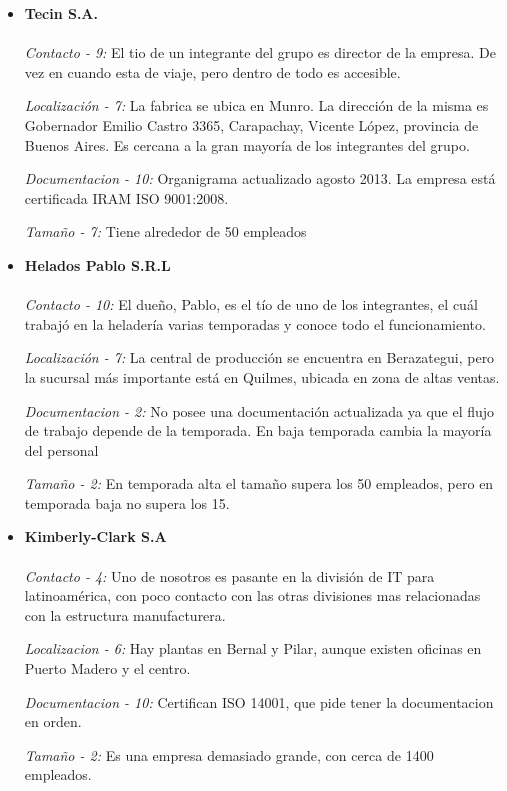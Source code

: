 \documentclass[a4paper,10pt]{article}
\begin{document}
\begin{itemize}

\item \textbf{Tecin S.A.}\\
\\
\textit{Contacto - 9:}
El tio de un integrante del grupo es director de la empresa. De vez en cuando esta de viaje, pero dentro de todo es accesible.

\textit{Localización - 7:}
La fabrica se ubica en Munro. La dirección de la misma es Gobernador Emilio Castro 3365, Carapachay, Vicente López, provincia de Buenos Aires. Es cercana a la gran mayoría de los integrantes del grupo.

\textit{Documentacion - 10:}
Organigrama actualizado agosto 2013. La empresa está certificada IRAM ISO 9001:2008.

\textit{Tamaño - 7:}
Tiene alrededor de 50 empleados

\item \textbf{Helados Pablo S.R.L} \\
\\
\textit{Contacto - 10:}
El dueño, Pablo, es el tío de uno de los integrantes, el cuál trabajó en la heladería varias temporadas y conoce todo el funcionamiento.

\textit{Localización - 7:}
La central de producción se encuentra en Berazategui, pero la sucursal más importante está en Quilmes, ubicada en zona de altas ventas.

\textit{Documentacion - 2:}
No posee una documentación actualizada ya que el flujo de trabajo depende de la temporada. En baja temporada cambia la mayoría del personal

\textit{Tamaño - 2:}
En temporada alta el tamaño supera los 50 empleados, pero en temporada baja no supera los 15.

\item \textbf{Kimberly-Clark S.A} \\
\\
\textit{Contacto - 4:}
Uno de nosotros es pasante en la división de IT para latinoamérica, con poco contacto con las otras divisiones mas relacionadas con la estructura manufacturera.

\textit{Localizacion - 6:}
Hay plantas en Bernal y Pilar, aunque existen oficinas en Puerto Madero y el centro.

\textit{Documentacion - 10:}
Certifican ISO 14001, que pide tener la documentacion en orden.

\textit{Tamaño - 2:}
Es una empresa demasiado grande, con cerca de 1400 empleados.



\end{itemize}
\end{document}
